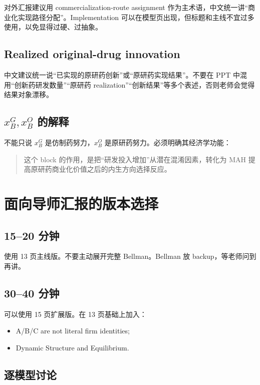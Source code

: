 \documentclass[12pt]{ctexart}
\begin{document}
对外汇报建议用 commercialization-route assignment 作为主术语，中文统一讲“商业化实现路径分配”。Implementation 可以在模型页出现，但标题和主线不宜过多使用，以免显得过硬、过抽象。

\subsection{Realized original-drug innovation}

中文建议统一说“已实现的原研药创新”或“原研药实现结果”。不要在 PPT 中混用“创新药研发数量”“原研药 realization”“创新结果”等多个表述，否则老师会觉得结果对象漂移。

\subsection{$x_B^G,x_B^O$ 的解释}

不能只说 $x_B^G$ 是仿制药努力，$x_B^O$ 是原研药努力。必须明确其经济学功能：

\begin{quote}
这个 block 的作用，是把“研发投入增加”从潜在混淆因素，转化为 MAH 提高原研药商业化价值之后的内生方向选择反应。
\end{quote}

\section{面向导师汇报的版本选择}

\subsection{15--20 分钟}

使用 13 页主线版。不要主动展开完整 Bellman。Bellman 放 backup，等老师问到再讲。

\subsection{30--40 分钟}

可以使用 15 页扩展版。在 13 页基础上加入：
\begin{itemize}
    \item A/B/C are not literal firm identities;
    \item Dynamic Structure and Equilibrium.
\end{itemize}

\subsection{逐模型讨论}
\end{document}
